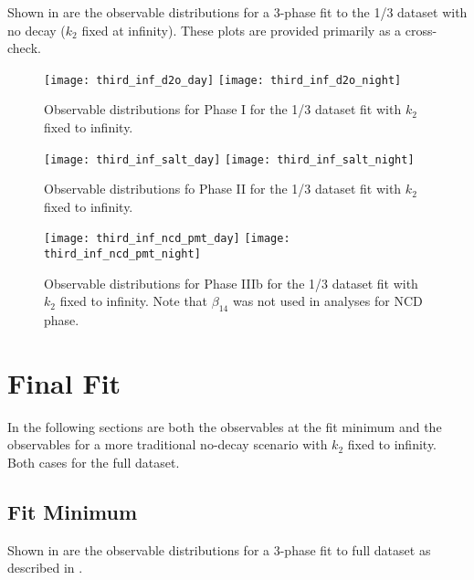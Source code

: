 Shown in  are the observable distributions for a 3-phase fit to the 1/3 dataset with no decay ($k_2$ fixed at infinity). These plots are provided primarily as a cross-check.

\begin{figure}
\centering
\texttt{[image: third\_inf\_d2o\_day]}
\texttt{[image: third\_inf\_d2o\_night]}
\caption{\label{fig:third_inf_d2o_obs}Observable distributions for Phase I for the 1/3 dataset fit with $k_2$ fixed to infinity.}
\end{figure}
\begin{figure}
\centering
\texttt{[image: third\_inf\_salt\_day]}
\texttt{[image: third\_inf\_salt\_night]}
\caption{\label{fig:third_inf_salt_obs}Observable distributions fo Phase II for the 1/3 dataset fit with $k_2$ fixed to infinity.}
\end{figure}
\begin{figure}
\centering
\texttt{[image: third\_inf\_ncd\_pmt\_day]}
\texttt{[image: third\_inf\_ncd\_pmt\_night]}
\caption{\label{fig:third_inf_ncd_pmt_obs}Observable distributions for Phase IIIb for the 1/3 dataset fit with $k_2$ fixed to infinity. Note that $\beta_{14}$ was not used in analyses for NCD phase.}
\end{figure}

\clearpage

\section{Final Fit}

\label{final_observables}

In the following sections are both the observables at the fit minimum and the observables for a more traditional no-decay scenario with $k_2$ fixed to infinity. Both cases for the full dataset.

\subsection{Fit Minimum}

Shown in  are the observable distributions for a 3-phase fit to full dataset as described in .

